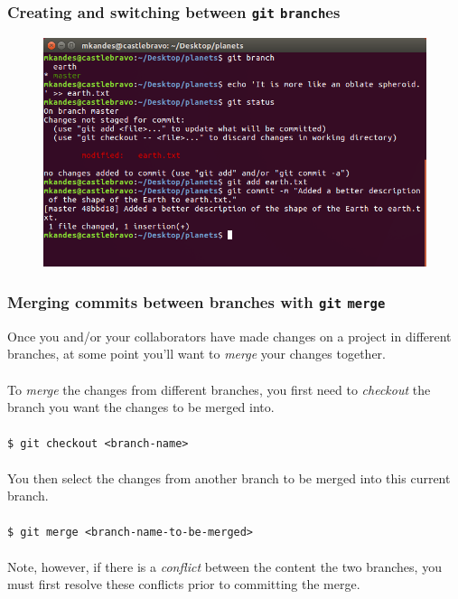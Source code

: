 \documentclass{beamer}
\begin{document}
\begin{frame}
   \frametitle{Creating and switching between \texttt{git} \texttt{branch}es}
   \begin{figure}[htbp]
      \includegraphics[width=1.0\textwidth]{images/git-branch-modifying-earth-on-master.png}
   \end{figure}
\end{frame}

\begin{frame}
   \frametitle{Merging commits between branches with \texttt{git} \texttt{merge}}
   Once you and/or your collaborators have made changes on a project in 
   different branches, at some point you'll want to \textit{merge} your 
   changes together. 
   \\ \ \\
   To \textit{merge} the changes from different branches, you first need
   to \textit{checkout} the branch you want the changes to be merged into.
   \\ \ \\
   \texttt{\hspace{1.0em}\$ git checkout <branch-name>}
   \\ \ \\
   You then select the changes from another branch to be merged into this 
   current branch. 
   \\ \ \\
   \texttt{\hspace{1.0em}\$ git merge <branch-name-to-be-merged>}
   \\ \ \\
   Note, however, if there is a \textit{conflict} between the content 
   the two branches, you must first resolve these conflicts prior to 
   committing the merge.
\end{frame}
\end{document}
